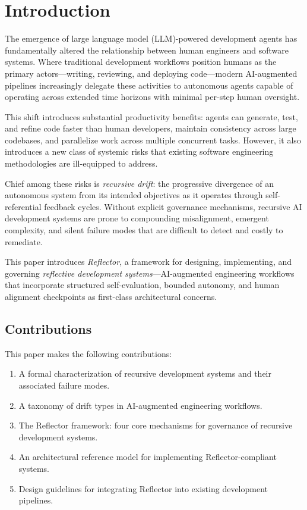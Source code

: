 \section{Introduction}
\label{sec:introduction}

%

The emergence of large language model (LLM)-powered development agents has fundamentally
altered the relationship between human engineers and software systems. Where traditional
development workflows position humans as the primary actors—writing, reviewing, and
deploying code—modern AI-augmented pipelines increasingly delegate these activities to
autonomous agents capable of operating across extended time horizons with minimal
per-step human oversight.

This shift introduces substantial productivity benefits: agents can generate, test, and
refine code faster than human developers, maintain consistency across large codebases,
and parallelize work across multiple concurrent tasks. However, it also introduces a
new class of systemic risks that existing software engineering methodologies are
ill-equipped to address.

Chief among these risks is \textit{recursive drift}: the progressive divergence of an
autonomous system from its intended objectives as it operates through self-referential
feedback cycles. Without explicit governance mechanisms, recursive AI development
systems are prone to compounding misalignment, emergent complexity, and silent failure
modes that are difficult to detect and costly to remediate.

This paper introduces \textit{Reflector}, a framework for designing, implementing, and
governing \textit{reflective development systems}—AI-augmented engineering workflows
that incorporate structured self-evaluation, bounded autonomy, and human alignment
checkpoints as first-class architectural concerns.

\subsection{Contributions}

This paper makes the following contributions:

\begin{enumerate}
  \item A formal characterization of recursive development systems and their associated
    failure modes.
  \item A taxonomy of drift types in AI-augmented engineering workflows.
  \item The Reflector framework: four core mechanisms for governance of recursive
    development systems.
  \item An architectural reference model for implementing Reflector-compliant systems.
  \item Design guidelines for integrating Reflector into existing development pipelines.
\end{enumerate}

